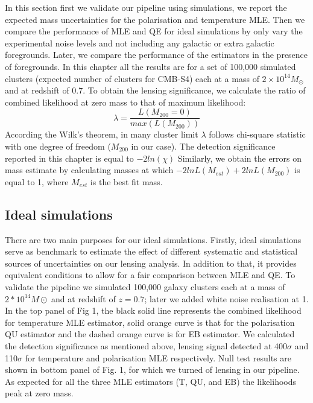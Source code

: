  In this section first we validate our pipeline using simulations, we report the expected mass uncertainties for the polarisation and temperature MLE. 
 Then we compare the performance of MLE and QE for ideal simulations by only vary the experimental noise levels and not including any galactic or extra galactic foregrounds. 
 Later, we compare the performance of the estimators in the presence of foregrounds. 
 In this chapter all the results are for a set of 100,000 simulated clusters (expected number of clusters for CMB-S4) each at a mass of $2\times10^{14} M_{\odot}$ and at redshift of 0.7.
 To obtain the lensing significance, we calculate the ratio of combined likelihood at zero mass to that of maximum likelihood:
 \begin{equation}
 \lambda = \frac{L (M_{200} =0)}{max(L(M_{200}))}
 \end{equation} 
 According the Wilk's theorem, in many cluster limit $\lambda $ follows chi-square statistic with one degree of freedom ($M_{200}$ in our case).
 The detection significance reported in this chapter is equal to $-2 ln (\chi)$
 Similarly, we obtain the errors on mass estimate by calculating masses at which $-2lnL(M_{est}) + 2 ln L (M_{200})$ is equal to 1, where $M_{est}$ is the best fit mass.
 
 
 \subsection{Ideal simulations}
 There are two main purposes for our ideal simulations. 
 Firstly, ideal simulations serve as benchmark to estimate the effect of different systematic and statistical sources of uncertainties on our lensing analysis. 
 In addition to that, it provides equivalent conditions to allow for a fair comparison between MLE and QE.
 To validate the pipeline we simulated 100,000 galaxy clusters each at a mass of $2*10^{14} M{\odot}$ and at redshift of $z = 0.7$; later we added white noise realisation at 1\ukam.
 In the top panel of Fig 1, the black solid line represents the combined likelihood for temperature MLE estimator, solid orange curve is that for the polarisation QU estimator and the dashed orange curve is for EB estimator. 
 We calculated the detection significance as mentioned above, lensing signal detected at 400$\sigma$ and 110$\sigma$ for temperature and polarisation MLE respectively. 
 Null test results are shown in bottom panel of Fig. 1, for which we turned of lensing in our pipeline.
 As expected for all the three MLE estimators (T, QU, and EB) the likelihoods peak at zero mass.
 
